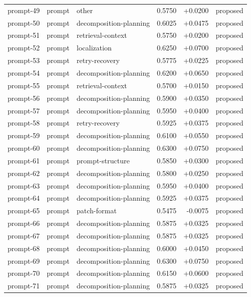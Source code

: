 \begin{center}
\begin{longtable}{llp{5.2cm}rrl}
prompt-49 & prompt & other & 0.5750 & +0.0200 & proposed \\
prompt-50 & prompt & decomposition-planning & 0.6025 & +0.0475 & proposed \\
prompt-51 & prompt & retrieval-context & 0.5750 & +0.0200 & proposed \\
prompt-52 & prompt & localization & 0.6250 & +0.0700 & proposed \\
prompt-53 & prompt & retry-recovery & 0.5775 & +0.0225 & proposed \\
prompt-54 & prompt & decomposition-planning & 0.6200 & +0.0650 & proposed \\
prompt-55 & prompt & retrieval-context & 0.5700 & +0.0150 & proposed \\
prompt-56 & prompt & decomposition-planning & 0.5900 & +0.0350 & proposed \\
prompt-57 & prompt & decomposition-planning & 0.5950 & +0.0400 & proposed \\
prompt-58 & prompt & retry-recovery & 0.5925 & +0.0375 & proposed \\
prompt-59 & prompt & decomposition-planning & 0.6100 & +0.0550 & proposed \\
prompt-60 & prompt & decomposition-planning & 0.6300 & +0.0750 & proposed \\
prompt-61 & prompt & prompt-structure & 0.5850 & +0.0300 & proposed \\
prompt-62 & prompt & decomposition-planning & 0.5800 & +0.0250 & proposed \\
prompt-63 & prompt & decomposition-planning & 0.5950 & +0.0400 & proposed \\
prompt-64 & prompt & decomposition-planning & 0.5925 & +0.0375 & proposed \\
prompt-65 & prompt & patch-format & 0.5475 & -0.0075 & proposed \\
prompt-66 & prompt & decomposition-planning & 0.5875 & +0.0325 & proposed \\
prompt-67 & prompt & decomposition-planning & 0.5875 & +0.0325 & proposed \\
prompt-68 & prompt & decomposition-planning & 0.6000 & +0.0450 & proposed \\
prompt-69 & prompt & decomposition-planning & 0.6300 & +0.0750 & proposed \\
prompt-70 & prompt & decomposition-planning & 0.6150 & +0.0600 & proposed \\
prompt-71 & prompt & decomposition-planning & 0.5875 & +0.0325 & proposed \\

\end{longtable}
\end{center}
